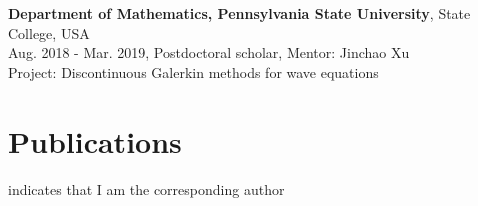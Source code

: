\documentclass[letterpaper]{article}
\begin{document}
\textbf{Department  of Mathematics, Pennsylvania State University}, State College, USA\\
\quad \quad Aug. 2018 - Mar. 2019, \quad\quad  Postdoctoral scholar,  \quad Mentor: Jinchao Xu\\
Project: Discontinuous Galerkin methods for wave equations\\




\section*{Publications}

\hfill {\bf *} indicates that I am the corresponding author
\end{document}
